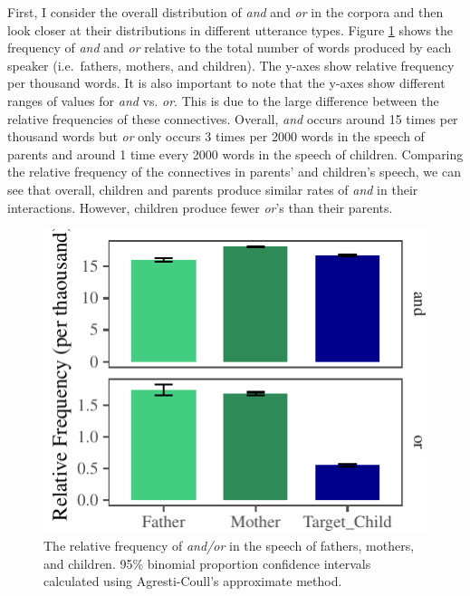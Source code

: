 \documentclass[floatsintext,man]{apa6}
\theoremstyle{definition}
\theoremstyle{definition}
\theoremstyle{definition}
\theoremstyle{remark}
\begin{document}
First, I consider the overall distribution of \emph{and} and \emph{or}
in the corpora and then look closer at their distributions in different
utterance types. Figure \ref{fig:freqTableBySpeakerPlot} shows the
frequency of \emph{and} and \emph{or} relative to the total number of
words produced by each speaker (i.e.~fathers, mothers, and children).
The y-axes show relative frequency per thousand words. It is also
important to note that the y-axes show different ranges of values for
\emph{and} vs. \emph{or}. This is due to the large difference between
the relative frequencies of these connectives. Overall, \emph{and}
occurs around 15 times per thousand words but \emph{or} only occurs 3
times per 2000 words in the speech of parents and around 1 time every
2000 words in the speech of children. Comparing the relative frequency
of the connectives in parents' and children's speech, we can see that
overall, children and parents produce similar rates of \emph{and} in
their interactions. However, children produce fewer \emph{or}'s than
their parents.

\begin{figure}[tb]

{\centering \includegraphics{figs/freqTableBySpeakerPlot-1} 

}

\caption{The relative frequency of \textit{and/or} in the speech of fathers, mothers, and children. 95\% binomial proportion confidence intervals calculated using Agresti-Coull's approximate method.}\label{fig:freqTableBySpeakerPlot}
\end{figure}
\end{document}
